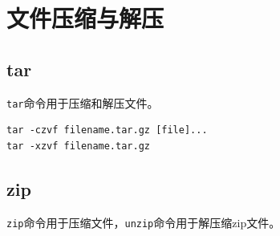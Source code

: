 \documentclass[12pt, openany, oneside]{book}
\begin{document}
\newpage

\section{文件压缩与解压}

\subsection{tar}

\lstinline|tar|命令用于压缩和解压文件。

\vspace{-0.5cm}
\begin{lstlisting}
tar -czvf filename.tar.gz [file]...
tar -xzvf filename.tar.gz
\end{lstlisting}

\begin{table}[H]
	\centering
	\caption{\lstinline|tar|参数说明}
\end{table}

\subsection{zip}

\lstinline|zip|命令用于压缩文件，\lstinline|unzip|命令用于解压缩zip文件。
\end{document}

